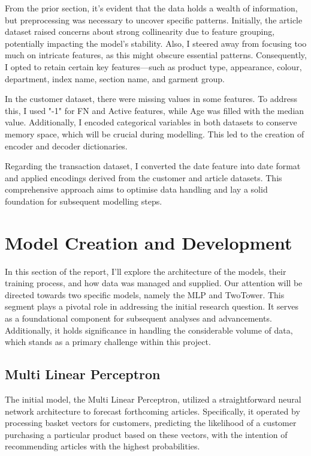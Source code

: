 \documentclass[conference,compsoc]{IEEEtran}
\begin{document}
From the prior section, it's evident that the data holds a wealth of information, but preprocessing was necessary to uncover specific patterns. Initially, the article dataset raised concerns about strong collinearity due to feature grouping, potentially impacting the model's stability. Also, I steered away from focusing too much on intricate features, as this might obscure essential patterns. Consequently, I opted to retain certain key features—such as product type, appearance, colour, department, index name, section name, and garment group.

In the customer dataset, there were missing values in some features. To address this, I used "-1" for FN and Active features, while Age was filled with the median value. Additionally, I encoded categorical variables in both datasets to conserve memory space, which will be crucial during modelling. This led to the creation of encoder and decoder dictionaries.

Regarding the transaction dataset, I converted the date feature into date format and applied encodings derived from the customer and article datasets. This comprehensive approach aims to optimise data handling and lay a solid foundation for subsequent modelling steps.

\section{Model Creation and Development}
In this section of the report, I'll explore the architecture of the models, their training process, and how data was managed and supplied. Our attention will be directed towards two specific models, namely the MLP and TwoTower. This segment plays a pivotal role in addressing the initial research question. It serves as a foundational component for subsequent analyses and advancements. Additionally, it holds significance in handling the considerable volume of data, which stands as a primary challenge within this project.

\subsection{Multi Linear Perceptron}
The initial model, the Multi Linear Perceptron, utilized a straightforward neural network architecture to forecast forthcoming articles. Specifically, it operated by processing basket vectors for customers, predicting the likelihood of a customer purchasing a particular product based on these vectors, with the intention of recommending articles with the highest probabilities.
\end{document}
